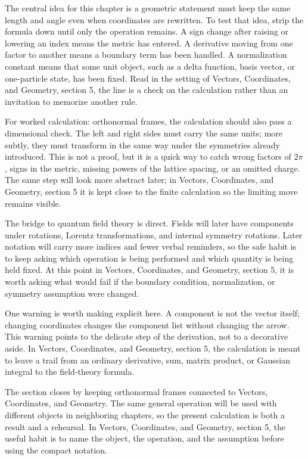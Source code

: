 The central idea for this chapter is a geometric statement must keep the same length and angle even when coordinates are rewritten.  To test that idea, strip the formula down until only the operation remains.  A sign change after raising or lowering an index means the metric has entered.  A derivative moving from one factor to another means a boundary term has been handled.  A normalization constant means that some unit object, such as a delta function, basis vector, or one-particle state, has been fixed.  Read in the setting of Vectors, Coordinates, and Geometry, section 5, the line is a check on the calculation rather than an invitation to memorize another rule.

For worked calculation: orthonormal frames, the calculation should also pass a dimensional check.  The left and right sides must carry the same units; more subtly, they must transform in the same way under the symmetries already introduced.  This is not a proof, but it is a quick way to catch wrong factors of \(2\pi\), signs in the metric, missing powers of the lattice spacing, or an omitted charge.  The same step will look more abstract later; in Vectors, Coordinates, and Geometry, section 5 it is kept close to the finite calculation so the limiting move remains visible.

The bridge to quantum field theory is direct.  Fields will later have components under rotations, Lorentz transformations, and internal symmetry rotations.  Later notation will carry more indices and fewer verbal reminders, so the safe habit is to keep asking which operation is being performed and which quantity is being held fixed.  At this point in Vectors, Coordinates, and Geometry, section 5, it is worth asking what would fail if the boundary condition, normalization, or symmetry assumption were changed.

One warning is worth making explicit here.  A component is not the vector itself; changing coordinates changes the component list without changing the arrow.  This warning points to the delicate step of the derivation, not to a decorative aside.  In Vectors, Coordinates, and Geometry, section 5, the calculation is meant to leave a trail from an ordinary derivative, sum, matrix product, or Gaussian integral to the field-theory formula.

The section closes by keeping orthonormal frames connected to Vectors, Coordinates, and Geometry.  The same general operation will be used with different objects in neighboring chapters, so the present calculation is both a result and a rehearsal.  In Vectors, Coordinates, and Geometry, section 5, the useful habit is to name the object, the operation, and the assumption before using the compact notation.




